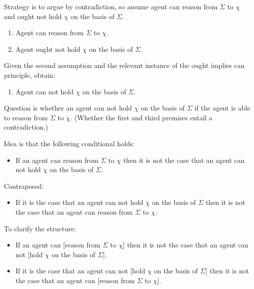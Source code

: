 \documentclass[10pt]{article}
\begin{document}
Strategy is to argue by contradiction, so assume agent can reason from \(\Sigma\) to \(\chi\) and ought not hold \(\chi\) on the basis of \(\Sigma\).

\begin{enumerate}
\item Agent can reason from \(\Sigma\) to \(\chi\).
\item Agent ought not hold \(\chi\) on the basis of \(\Sigma\).
\end{enumerate}

Given the second assumption and the relevant instance of the ought implies can principle, obtain:

\begin{enumerate}
\item Agent can not hold \(\chi\) on the basis of \(\Sigma\).
\end{enumerate}

Question is whether an agent can not hold \(\chi\) on the basis of \(\Sigma\) if the agent is able to reason from \(\Sigma\) to \(\chi\).
(Whether the first and third premises entail a contradiction.)

Idea is that the following conditional holds:

\begin{itemize}
\item If an agent can reason from \(\Sigma\) to \(\chi\) then it is not the case that an agent can not hold \(\chi\) on the basis of \(\Sigma\).
\end{itemize}

Contraposed:

\begin{itemize}
\item If it is the case that an agent can not hold \(\chi\) on the basis of \(\Sigma\) then it is not the case that an agent can reason from \(\Sigma\) to \(\chi\).
\end{itemize}

To clarify the structure:

\begin{itemize}
\item If an agent can [reason from \(\Sigma\) to \(\chi\)] then it is not the case that an agent can not [hold \(\chi\) on the basis of \(\Sigma\)].
\item If it is the case that an agent can not [hold \(\chi\) on the basis of \(\Sigma\)] then it is not the case that an agent can [reason from \(\Sigma\) to \(\chi\)].
\end{itemize}
\end{document}
